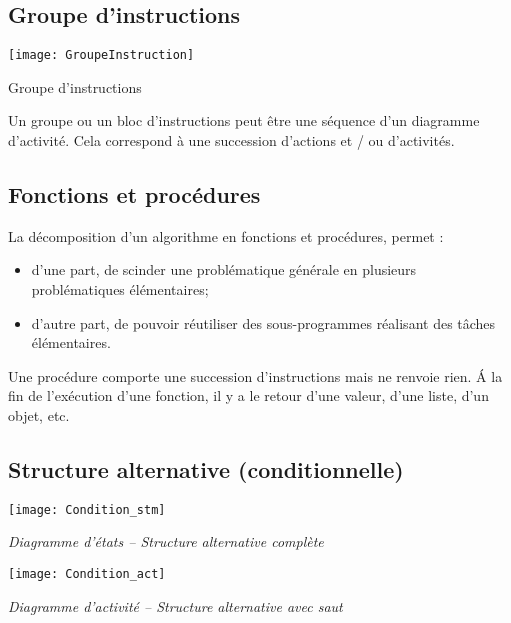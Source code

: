 \subsection{Groupe d'instructions}

\begin{marginfigure}
\texttt{[image: GroupeInstruction]}
\caption{Groupe d'instructions}
\end{marginfigure}

Un groupe ou un bloc d’instructions peut être une séquence d’un diagramme
d’activité. Cela correspond à une succession d’actions et / ou d’activités.


\subsection{Fonctions et procédures}
La décomposition d’un algorithme en fonctions et procédures, permet :
\begin{itemize}
\item d’une part, de scinder une problématique générale en plusieurs problématiques
élémentaires;
\item d’autre part, de pouvoir réutiliser des sous-programmes réalisant des tâches élémentaires.
\end{itemize}

%
%
%

Une procédure comporte une succession d’instructions mais ne renvoie rien.
\'A la fin de l’exécution d’une fonction, il y a le retour d’une valeur, d’une liste, d’un objet, etc.
\subsection{Structure alternative (conditionnelle)}

\begin{minipage}[c]{.48\linewidth}
\begin{center}
\texttt{[image: Condition\_stm]}

\textit{Diagramme d'états -- Structure alternative complète}
\end{center}
\end{minipage} \hfill
\begin{minipage}[c]{.48\linewidth}
\begin{center}
\texttt{[image: Condition\_act]}

\textit{Diagramme d'activité -- Structure alternative avec saut}
\end{center}
\end{minipage}

